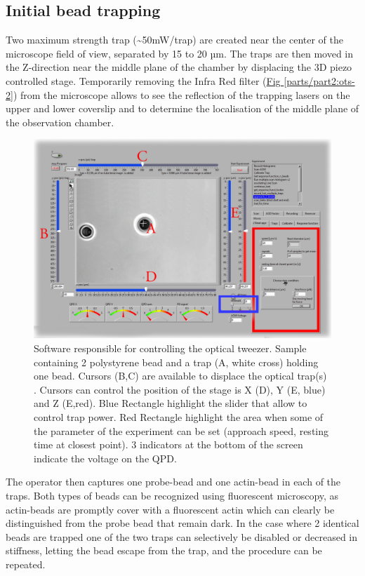\documentclass[A4paperpaper,11pt,english]{sphinxmanual}
\begin{document}
\subsection{Initial bead trapping}
\label{parts/part2:initial-bead-trapping}
Two maximum strength trap (\textasciitilde{}50mW/trap) are created near the center of the
microscope field of view, separated by 15 to 20 µm. The traps are then moved in
the Z-direction near the middle plane of the chamber by displacing the 3D piezo
controlled stage. Temporarily removing the Infra Red filter (\hyperref[parts/part2:ots-2]{Fig  \ref*{parts/part2:ots-2}})
from the microscope allows to see the reflection of the trapping lasers on the
upper and lower coverslip and to determine the localisation of the middle plane
of the observation chamber.
\begin{figure}[htbp]
\centering
\capstart

\includegraphics[width=0.800\linewidth]{frontend.png}
\caption{Software responsible for controlling the optical tweezer.  Sample
containing 2 polystyrene bead and a trap (A, white cross) holding one bead.
Cursors (B,C) are available to displace the optical trap(s) .  Cursors can
control the position of the stage is X (D), Y (E, blue) and Z (E,red).
Blue Rectangle highlight the slider that allow to control trap power.  Red
Rectangle highlight the area when some of the parameter of the experiment
can be set (approach speed, resting time at closest point). 3 indicators at
the bottom of the screen indicate the voltage on the QPD.}\end{figure}

The operator then captures one probe-bead and one actin-bead in each of the
traps.  Both types of beads can be recognized using fluorescent microscopy, as
actin-beads are promptly cover with a fluorescent actin
which  can clearly be distinguished from the probe bead that remain dark.
In the case where 2 identical beads are trapped one of the two traps can selectively
be disabled or decreased in stiffness, letting the bead escape from  the trap,
and the procedure can be repeated.
\end{document}
